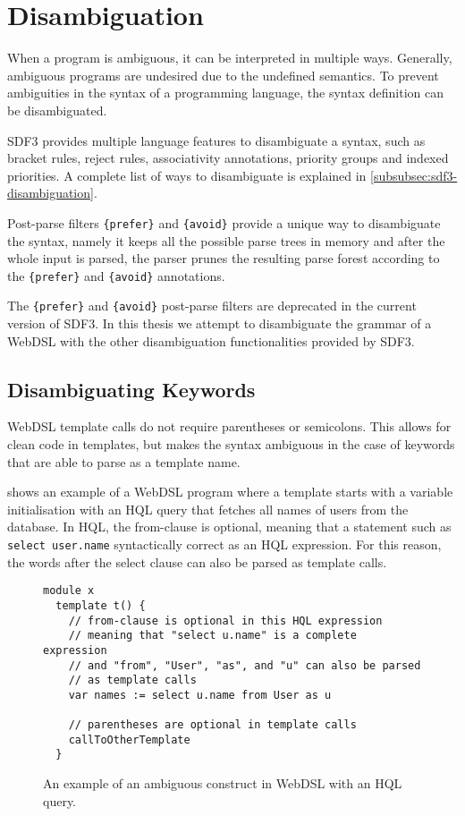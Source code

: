   \section{\label{sec:webdsl-sdf3-disambiguation}Disambiguation}
  
    When a program is ambiguous, it can be interpreted in multiple ways. Generally, ambiguous programs are undesired due to the undefined semantics. To prevent ambiguities in the syntax of a programming language, the syntax definition can be disambiguated.

    SDF3 provides multiple language features to disambiguate a syntax, such as bracket rules, reject rules, associativity annotations, priority groups and indexed priorities. A complete list of ways to disambiguate is explained in \cref{subsubsec:sdf3-disambiguation}.

    Post-parse filters \texttt{\{prefer\}} and \texttt{\{avoid\}} provide a unique way to disambiguate the syntax, namely it keeps all the possible parse trees in memory and after the whole input is parsed, the parser prunes the resulting parse forest according to the \texttt{\{prefer\}} and \texttt{\{avoid\}} annotations.
    
    The \texttt{\{prefer\}} and \texttt{\{avoid\}} post-parse filters are deprecated in the current version of SDF3. In this thesis we attempt to disambiguate the grammar of a WebDSL with the other disambiguation functionalities provided by SDF3.

    \subsection{Disambiguating Keywords}

      WebDSL template calls do not require parentheses or semicolons. This allows for clean code in templates, but makes the syntax ambiguous in the case of keywords that are able to parse as a template name.
      
       shows an example of a WebDSL program where a template starts with a variable initialisation with an HQL query that fetches all names of users from the database. In HQL, the from-clause is optional, meaning that a statement such as \texttt{select user.name} syntactically correct as an HQL expression. For this reason, the words after the select clause can also be parsed as template calls.

      \begin{figure}
        \begin{verbatim}
module x
  template t() {
    // from-clause is optional in this HQL expression
    // meaning that "select u.name" is a complete expression
    // and "from", "User", "as", and "u" can also be parsed
    // as template calls
    var names := select u.name from User as u

    // parentheses are optional in template calls
    callToOtherTemplate
  }
        \end{verbatim}
        \caption{\label{fig:sdf3-keywords-ambiguous}An example of an ambiguous construct in WebDSL with an HQL query.}
      \end{figure}

